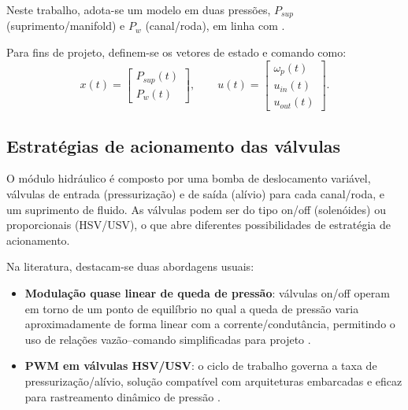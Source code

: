 Neste trabalho, adota-se um modelo em duas pressões, $P_{sup}$ (suprimento/manifold) e $P_w$ (canal/roda), em linha com .

Para fins de projeto, definem-se os vetores de estado e comando como:
\begin{equation}
    x(t) =
    \begin{bmatrix}
        P_{sup}(t) \\[2pt]
        P_{w}(t)
    \end{bmatrix},
    \qquad
    u(t) =
    \begin{bmatrix}
        \omega_p(t) \\[2pt]
        u_{in}(t)   \\[2pt]
        u_{out}(t)
    \end{bmatrix}.
    \label{eq:vect-estados-hidraulico}
\end{equation}


\subsection{Estratégias de acionamento das válvulas}
\label{sec:controle-4-1-1}

O módulo hidráulico é composto por uma bomba de deslocamento variável, válvulas de entrada (pressurização) e de saída (alívio) para cada canal/roda, e um suprimento de fluido. As válvulas podem ser do tipo on/off (solenóides) ou proporcionais (HSV/USV), o que abre diferentes possibilidades de estratégia de acionamento.

Na literatura, destacam-se duas abordagens usuais:
\begin{itemize}
    \item \textbf{Modulação quase linear de queda de pressão}: válvulas on/off operam em torno de um ponto de equilíbrio no qual a queda de pressão varia aproximadamente de forma linear com a corrente/condutância, permitindo o uso de relações vazão–comando simplificadas para projeto \cite{ChenLv2017}.
    \item \textbf{PWM em válvulas HSV/USV}: o ciclo de trabalho governa a taxa de pressurização/alívio, solução compatível com arquiteturas embarcadas e eficaz para rastreamento dinâmico de pressão \cite{HouhuaJing2022}.
\end{itemize}

